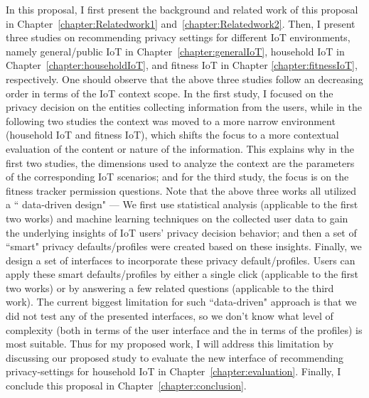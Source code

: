 In this proposal, I first present the background and related work of this proposal in Chapter~\ref{chapter:Relatedwork1} and~\ref{chapter:Relatedwork2}. Then, I present three studies on recommending privacy settings for different IoT environments, namely general/public IoT in Chapter~\ref{chapter:generalIoT}, household IoT in Chapter~\ref{chapter:householdIoT}, and fitness IoT in Chapter \ref{chapter:fitnessIoT}, respectively. One should observe that the above three studies follow an decreasing order in terms of the IoT context scope. In the first study, I focused on the privacy decision on the entities collecting information from the users, while in the following two studies the context was moved to a more narrow environment (household IoT and fitness IoT), which shifts the focus to a more contextual evaluation of the content or nature of the information. This explains why in the first two studies, the dimensions used to analyze the context are the parameters of the corresponding IoT scenarios; and for the third study, the focus is on the fitness tracker permission questions. Note that the above three works all utilized a `` data-driven design" --- We first use statistical analysis (applicable to the first two works) and machine learning techniques on the collected user data to gain the underlying insights of IoT users' privacy decision behavior; and then a set of ``smart" privacy defaults/profiles were created based on these insights. Finally, we design a set of interfaces to incorporate these privacy default/profiles. Users can apply these smart defaults/profiles by either a single click (applicable to the first two works) or by answering a few related questions (applicable to the third work). The current biggest limitation for such ``data-driven" approach is that we did not test any of the presented interfaces, so we don't know what level of complexity (both in terms of the user interface and the in terms of the profiles) is most suitable. Thus for my proposed work, I will address this limitation by discussing our proposed study to evaluate the new interface of recommending privacy-settings for household IoT in Chapter~\ref{chapter:evaluation}. Finally, I conclude this proposal in Chapter~\ref{chapter:conclusion}.


